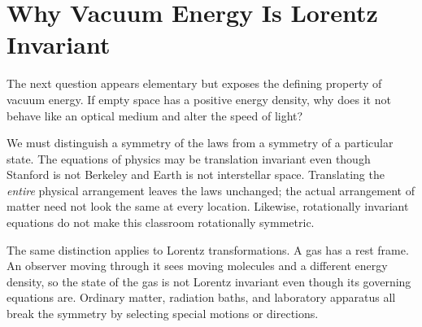 \begin{classroomqa}
\end{classroomqa}

\begin{classroomqa}
\end{classroomqa}

\section{Why Vacuum Energy Is Lorentz Invariant}

The next question appears elementary but exposes the defining property of vacuum energy. If empty space has a positive energy density, why does it not behave like an optical medium and alter the speed of light?

\begin{classroomqa}
\end{classroomqa}

We must distinguish a symmetry of the laws from a symmetry of a particular state. The equations of physics may be translation invariant even though Stanford is not Berkeley and Earth is not interstellar space. Translating the \emph{entire} physical arrangement leaves the laws unchanged; the actual arrangement of matter need not look the same at every location. Likewise, rotationally invariant equations do not make this classroom rotationally symmetric.

The same distinction applies to Lorentz transformations. A gas has a rest frame. An observer moving through it sees moving molecules and a different energy density, so the state of the gas is not Lorentz invariant even though its governing equations are. Ordinary matter, radiation baths, and laboratory apparatus all break the symmetry by selecting special motions or directions.

